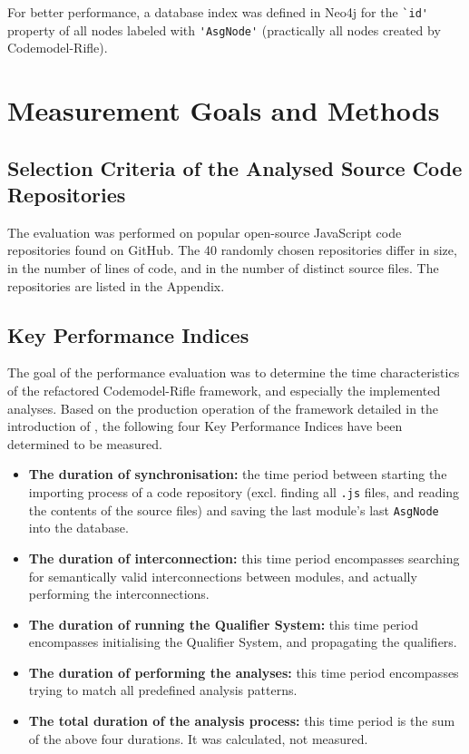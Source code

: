 For better performance, a database index was defined in Neo4j for the \lstinline{`id'} property of all nodes labeled with \lstinline{'AsgNode'} (practically all nodes created by Codemodel-Rifle).


\section{Measurement Goals and Methods}

\subsection{Selection Criteria of the Analysed Source Code Repositories}

The evaluation was performed on popular open-source JavaScript code repositories found on GitHub. The 40 randomly chosen repositories differ in size, in the number of lines of code, and in the number of distinct source files. The repositories are listed in the Appendix.


\subsection{Key Performance Indices}

The goal of the performance evaluation was to determine the time characteristics of the refactored Codemodel-Rifle framework, and especially the implemented analyses. Based on the production operation of the framework detailed in the introduction of , the following four Key Performance Indices have been determined to be measured.

\begin{itemize}
\item \textbf{The duration of synchronisation:} the time period between starting the importing process of a code repository (excl. finding all \lstinline{.js} files, and reading the contents of the source files) and saving the last module's last \lstinline{AsgNode} into the database.
\item \textbf{The duration of interconnection:} this time period encompasses searching for semantically valid interconnections between modules, and actually performing the interconnections.
\item \textbf{The duration of running the Qualifier System:} this time period encompasses initialising the Qualifier System, and propagating the qualifiers.
\item \textbf{The duration of performing the analyses:} this time period encompasses trying to match all predefined analysis patterns.
\item \textbf{The total duration of the analysis process:} this time period is the sum of the above four durations. It was calculated, not measured.
\end{itemize}

